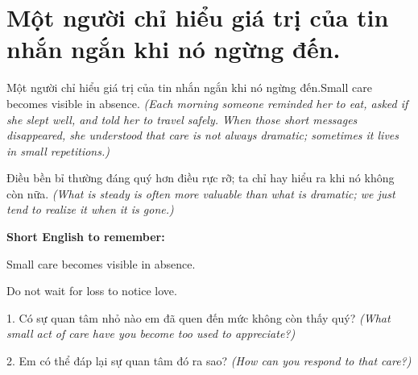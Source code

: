 \section{Một người chỉ hiểu giá trị của tin nhắn ngắn khi nó ngừng đến.}
\begin{truyen}{Một người chỉ hiểu giá trị của tin nhắn ngắn khi nó ngừng đến.}{Small care becomes visible in absence.}
\textit{(Each morning someone reminded her to eat, asked if she slept well, and told her to travel safely. When those short messages disappeared, she understood that care is not always dramatic; sometimes it lives in small repetitions.)}
\end{truyen}
\begin{baihoc}
Điều bền bỉ thường đáng quý hơn điều rực rỡ; ta chỉ hay hiểu ra khi nó không còn nữa.
\textit{(What is steady is often more valuable than what is dramatic; we just tend to realize it when it is gone.)}
\end{baihoc}
\begin{ghinhoanh}
\textbf{Short English to remember:}

Small care becomes visible in absence.

Do not wait for loss to notice love.
\end{ghinhoanh}
\begin{tuhocnhanh}
1. Có sự quan tâm nhỏ nào em đã quen đến mức không còn thấy quý? \textit{(What small act of care have you become too used to appreciate?)}

2. Em có thể đáp lại sự quan tâm đó ra sao? \textit{(How can you respond to that care?)}
\end{tuhocnhanh}
\ngancach

